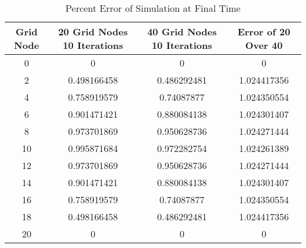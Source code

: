 \documentclass[12pt]{article}
\begin{document}
\begin{table}[ht]
\caption{Percent Error of Simulation at Final Time} %
\centering %
\begin{tabular}{c c c c} %
\hline\hline %
Grid Node & 20 Grid Nodes 10 Iterations & 40 Grid Nodes 10 Iterations & Error of 20 Over 40 \\ [0.5ex] %
\hline %
0&	0&		0&0 \\
2&	0.498166458&	0.486292481	&	1.024417356 \\
4&	0.758919579&	0.74087877	&	1.024350554 \\
6&	0.901471421&	0.880084138	&	1.024301407 \\
8&	0.973701869&	0.950628736	&	1.024271444 \\
10&	0.995871684&	0.972282754	&	1.024261389 \\
12&	0.973701869&	0.950628736	&	1.024271444 \\
14&	0.901471421&	0.880084138	&	1.024301407 \\
16&	0.758919579&	0.74087877	&	1.024350554 \\
18&	0.498166458&	0.486292481	&	1.024417356 \\
20&	0	&0	&0		\\ [1ex] %
\hline %
\end{tabular}
\label{table:nonlin} %
\end{table}
\end{document}
